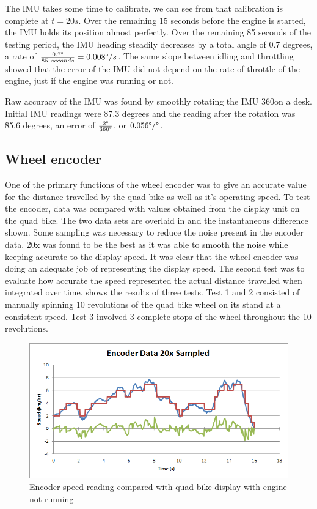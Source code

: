 \documentclass[main.tex]{subfiles}
\begin{document}
The IMU takes some time to calibrate, we can see from  that calibration is complete at $t=20s$. Over the remaining 15 seconds before the engine is started, the IMU holds its position almost perfectly. Over the remaining 85 seconds of the testing period, the IMU heading steadily decreases by a total angle of 0.7 degrees, a rate of $\frac{0.7\degree}{85\ seconds} = 0.008 \degree/s$. The same slope between idling and throttling showed that the error of the IMU did not depend on the rate of throttle of the engine, just if the engine was running or not.

Raw accuracy of the IMU was found by smoothly rotating the IMU 360\degree on a desk. Initial IMU readings were 87.3 degrees and the reading after the rotation was \~85.6 degrees, an error of $\frac{2\degree}{360\degree}$, or $0.056\degree/\degree$.

\subsection{Wheel encoder}
One of the primary functions of the wheel encoder was to give an accurate value for the distance travelled by the quad bike as well as it's operating speed. To test the encoder, data was compared with values obtained from the display unit on the quad bike. The two data sets are overlaid in  and the instantaneous difference shown. Some sampling was necessary to reduce the noise present in the encoder data. 20x was found to be the best as it was able to smooth the noise while keeping accurate to the display speed. It was clear that the wheel encoder was doing an adequate job of representing the display speed. The second test was to evaluate how accurate the speed represented the actual distance travelled when integrated over time.  shows the results of three tests. Test 1 and 2 consisted of manually spinning 10 revolutions of the quad bike wheel on its stand at a consistent speed. Test 3 involved 3 complete stops of the wheel throughout the 10 revolutions.

\begin{figure}[ht]
\includegraphics[width=1\textwidth]{5-Testing/encoder_data_20x_sampled.png}
\centering
\caption{Encoder speed reading compared with quad bike display with engine not running}
\end{figure}
\end{document}

